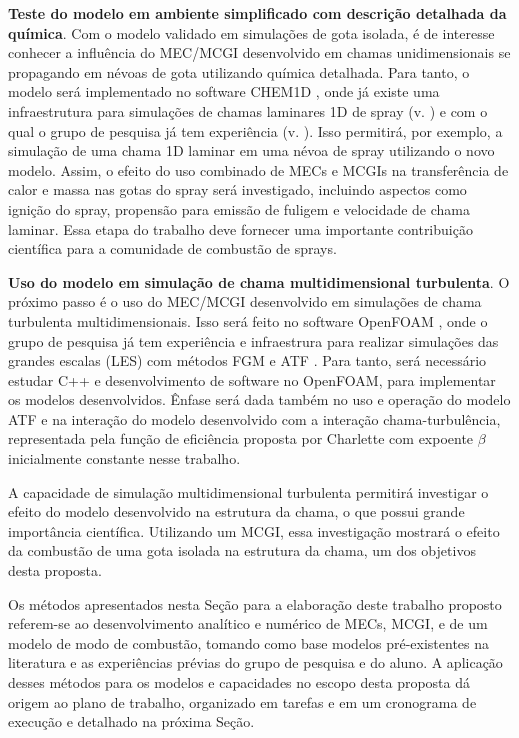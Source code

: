 \textbf{Teste do modelo em ambiente simplificado com descrição detalhada da química}.
Com o modelo validado em simulações de gota isolada, é de interesse conhecer a influência do MEC/MCGI desenvolvido em chamas unidimensionais se propagando em névoas de gota utilizando química detalhada.
Para tanto, o modelo será implementado no software CHEM1D \cite{Sommers1994PhD}, onde já existe uma infraestrutura para simulações de chamas laminares 1D de spray (v. \cite{Sommers1994PhD,vanOijen2002CTM,vanOijen2016PECS, SacomanoF2018CTM,SacomanoF2021Fluids}) e com o qual o grupo de pesquisa já tem experiência (v. \cite{SacomanoF2018CTM,SacomanoF2019IJHMT,SacomanoF2021Fluids,SacomanoF2024CF,SacomanoF2025CF}).
Isso permitirá, por exemplo, a simulação de uma chama 1D laminar em uma névoa de spray utilizando o novo modelo.
Assim, o efeito do uso combinado de MECs e MCGIs na transferência de calor e massa nas gotas do spray será investigado, incluindo aspectos como ignição do spray, propensão para emissão de fuligem e velocidade de chama laminar.
Essa etapa do trabalho deve fornecer uma importante contribuição científica para a comunidade de combustão de sprays.


\textbf{Uso do modelo em simulação de chama multidimensional turbulenta}.
O próximo passo é o uso do MEC/MCGI desenvolvido em simulações de chama turbulenta multidimensionais.
Isso será feito no software OpenFOAM \cite{JasakOpenFOAM}, onde o grupo de pesquisa já tem experiência e infraestrura para realizar simulações das grandes escalas (LES) com métodos FGM e ATF \cite{SacomanoF2017PhD,SacomanoF2017CF,SacomanoF2020CF}.
Para tanto, será necessário estudar C++ e desenvolvimento de software no OpenFOAM, para implementar os modelos desenvolvidos.
Ênfase será dada também no uso e operação do modelo ATF e na interação do modelo desenvolvido com a interação chama-turbulência, representada pela função de eficiência proposta por Charlette \cite{CharletteF2002} com expoente $\beta$ inicialmente constante nesse trabalho. 

A capacidade de simulação multidimensional turbulenta permitirá investigar o efeito do modelo desenvolvido na estrutura da chama, o que possui grande importância científica.
Utilizando um MCGI, essa investigação mostrará o efeito da combustão de uma gota isolada na estrutura da chama, um dos objetivos desta proposta.

Os métodos apresentados nesta Seção para a elaboração deste trabalho proposto referem-se ao desenvolvimento analítico e numérico de MECs, MCGI, e de um modelo de modo de combustão, tomando como base modelos pré-existentes na literatura e as experiências prévias do grupo de pesquisa e do aluno.
A aplicação desses métodos para os modelos e capacidades no escopo desta proposta dá origem ao plano de trabalho, organizado em tarefas e em um cronograma de execução e detalhado na próxima Seção.

